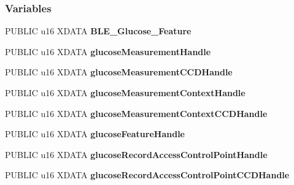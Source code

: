 \subsubsection*{Variables}
\begin{DoxyCompactItemize}
\item 
P\+U\+B\+L\+IC u16 X\+D\+A\+TA {\bfseries B\+L\+E\+\_\+\+Glucose\+\_\+\+Feature}\hypertarget{group___b_l_e___g_s_gaf4fb23312f2686352ce2f4ad702c04ea}{}\label{group___b_l_e___g_s_gaf4fb23312f2686352ce2f4ad702c04ea}

\item 
P\+U\+B\+L\+IC u16 X\+D\+A\+TA {\bfseries glucose\+Measurement\+Handle}\hypertarget{group___b_l_e___g_s_gae0920e46d9316d3fa6139c3d60c48082}{}\label{group___b_l_e___g_s_gae0920e46d9316d3fa6139c3d60c48082}

\item 
P\+U\+B\+L\+IC u16 X\+D\+A\+TA {\bfseries glucose\+Measurement\+C\+C\+D\+Handle}\hypertarget{group___b_l_e___g_s_ga31a21181477491b50c17cd1accc2cbd0}{}\label{group___b_l_e___g_s_ga31a21181477491b50c17cd1accc2cbd0}

\item 
P\+U\+B\+L\+IC u16 X\+D\+A\+TA {\bfseries glucose\+Measurement\+Context\+Handle}\hypertarget{group___b_l_e___g_s_ga78749b158dd187b2405758b9ef6ac440}{}\label{group___b_l_e___g_s_ga78749b158dd187b2405758b9ef6ac440}

\item 
P\+U\+B\+L\+IC u16 X\+D\+A\+TA {\bfseries glucose\+Measurement\+Context\+C\+C\+D\+Handle}\hypertarget{group___b_l_e___g_s_ga655e26b1a58dab5791f4d89951991644}{}\label{group___b_l_e___g_s_ga655e26b1a58dab5791f4d89951991644}

\item 
P\+U\+B\+L\+IC u16 X\+D\+A\+TA {\bfseries glucose\+Feature\+Handle}\hypertarget{group___b_l_e___g_s_gaab912bdb5be5d57830eed58c55fd3217}{}\label{group___b_l_e___g_s_gaab912bdb5be5d57830eed58c55fd3217}

\item 
P\+U\+B\+L\+IC u16 X\+D\+A\+TA {\bfseries glucose\+Record\+Access\+Control\+Point\+Handle}\hypertarget{group___b_l_e___g_s_ga3d38df59f8f32d761f97140d6aab4e08}{}\label{group___b_l_e___g_s_ga3d38df59f8f32d761f97140d6aab4e08}

\item 
P\+U\+B\+L\+IC u16 X\+D\+A\+TA {\bfseries glucose\+Record\+Access\+Control\+Point\+C\+C\+D\+Handle}\hypertarget{group___b_l_e___g_s_gaea0364103e8a70516168672a021da0b1}{}\label{group___b_l_e___g_s_gaea0364103e8a70516168672a021da0b1}

\end{DoxyCompactItemize}



